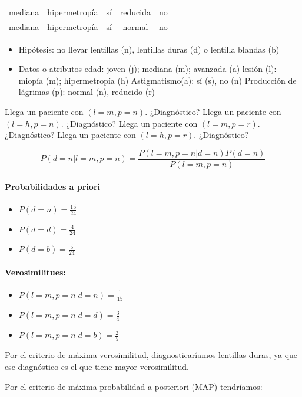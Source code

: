 \documentclass{apuntes}
\begin{document}
\begin{problem}[lentillas]
\begin{tabular}{c|c|c|c|c}
mediana & hipermetropía & sí & reducida & no \\
mediana & hipermetropía & sí & normal & no 

\end{tabular}

\begin{itemize}
	\item Hipótesis: no llevar lentillas (n), lentillas duras (d) o lentilla blandas (b)
	\item Datos o atributos
	\subitem edad: joven (j); mediana (m); avanzada (a)
	\subitem lesión (l): miopía (m); hipermetropía (h)
	\subitem Astigmatismo(a): sí (s), no (n)
	\subitem Producción de lágrimas (p): normal (n), reducido (r)
\end{itemize}

\ppart Llega un paciente con $(l=m,p=n)$. ¿Diagnóstico?
\ppart Llega un paciente con $(l=h,p=n)$. ¿Diagnóstico?
\ppart Llega un paciente con $(l=m,p=r)$. ¿Diagnóstico?
\ppart Llega un paciente con $(l=h,p=r)$. ¿Diagnóstico?


\solution 

\spart \[P(d=n | l=m, p=n ) = \frac{P(l=m, p=n | d=n) P(d=n)}{P(l=m, p=n)}\]

\paragraph{Probabilidades a priori}
\begin{itemize}
	\item $P(d=n) = \frac{15}{24}$
	\item $P(d=d) = \frac{4}{24}$
	\item $P(d=b) = \frac{5}{24}$
\end{itemize}
\paragraph{Verosimilitues:}
\begin{itemize}
	\item $P(l=m,p=n | d = n) = \frac{1}{15}$
	\item $P(l=m,p=n | d=d) = \frac{3}{4}$
	\item $P(l=m,p=n | d=b) = \frac{2}{5}$
\end{itemize}

Por el criterio de máxima verosimilitud, diagnosticaríamos lentillas duras, ya que ese diagnóstico es el que tiene mayor verosimilitud.

Por el criterio de máxima probabilidad a posteriori (MAP) tendríamos:


\end{problem}
\end{document}
